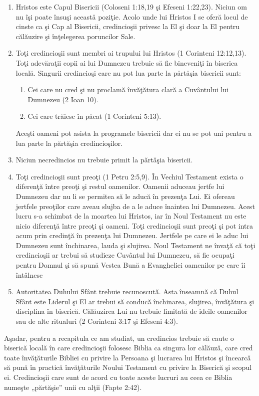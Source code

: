 \begin{enumerate}

	\item Hristos este Capul Bisericii (Coloseni 1:18,19 şi Efeseni 1:22,23). Niciun om nu îşi poate însuşi această poziţie. Acolo unde lui Hristos I se oferă locul de cinste ca şi Cap al Bisericii, credincioşii privesc la El şi doar la El pentru călăuzire şi înţelegerea poruncilor Sale. 
	
	\item Toţi credincioşii sunt membri ai trupului lui Hristos (1 Corinteni 12:12,13). Toţi adevăraţii copii ai lui Dumnezeu trebuie să fie bineveniţi în biserica locală. Singurii credincioşi care nu pot lua parte la părtăşia bisericii sunt:
	
	\begin{enumerate}
		
		\item Cei care nu cred şi nu proclamă învăţătura clară a Cuvântului lui Dumnezeu (2 Ioan 10).
		\item Cei care trăiesc în păcat (1 Corinteni 5:13).
	\end{enumerate}
	
Aceşti oameni pot asista la programele bisericii dar ei nu se pot uni pentru a lua parte la părtăşia credincioşilor.
	
	\item Niciun necredincios nu trebuie primit la părtăşia bisericii.
	
	\item Toţi credincioşii sunt preoţi (1 Petru 2:5,9). În Vechiul Testament exista o diferenţă între preoţi şi restul oamenilor. Oamenii aduceau jertfe lui Dumnezeu dar nu li se permitea să le aducă în prezenţa Lui. Ei ofereau jertfele preoţilor care aveau slujba de a le aduce înaintea lui Dumnezeu. Acest lucru s-a schimbat de la moartea lui Hristos, iar în Noul Testament nu este nicio diferenţă între preoţi şi oameni. Toţi credincioşii sunt preoţi şi pot intra acum prin credinţă în prezenţa lui Dumnezeu. Jertfele pe care ei le aduc lui Dumnezeu sunt închinarea, lauda şi slujirea. Noul Testament ne învaţă că toţi credincioşii ar trebui să studieze Cuvântul lui Dumnezeu, să fie ocupaţi pentru Domnul şi să spună Vestea Bună a Evangheliei oamenilor pe care îi întâlnesc
	
	\item Autoritatea Duhului Sfânt trebuie recunoscută. Asta înseamnă că Duhul Sfânt este Liderul şi El ar trebui să conducă închinarea, slujirea, învăţătura şi disciplina în biserică. Călăuzirea Lui nu trebuie limitată de ideile oamenilor sau de alte ritualuri (2 Corinteni 3:17 şi Efeseni 4:3).
	
\end{enumerate}

Aşadar, pentru a recapitula ce am studiat, un credincios trebuie să caute o biserică locală în care credincioşii folosesc Biblia ca singura lor călăuză, care cred toate învăţăturile Bibliei cu privire la Persoana şi lucrarea lui Hristos şi încearcă să pună în practică învăţăturile Noului Testament cu privire la Biserică şi scopul ei. Credincioşii care sunt de acord cu toate aceste lucruri au ceea ce Biblia numeşte „părtăşie” unii cu alţii (Fapte 2:42).

